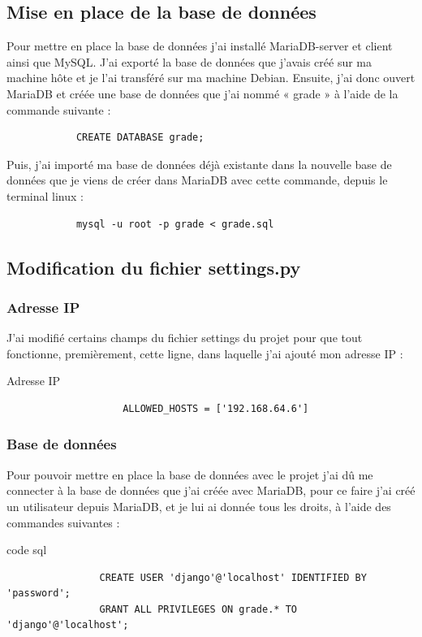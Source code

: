 \documentclass[12pt, a4paper]{article}
\begin{document}
        \subsection{Mise en place de la base de données}
        Pour mettre en place la base de données j’ai installé MariaDB-server et client ainsi que MySQL. J’ai exporté la base de données que j’avais créé sur ma machine hôte et je l’ai transféré sur ma machine Debian. Ensuite, j’ai donc ouvert MariaDB et créée une base de données que j’ai nommé « grade » à l’aide de la commande suivante : 
        \begin{verbatim}
            CREATE DATABASE grade;
        \end{verbatim}
        Puis, j’ai importé ma base de données déjà existante dans la nouvelle base de données que je viens de créer dans MariaDB avec cette commande, depuis le terminal linux : 
        \begin{verbatim}
            mysql -u root -p grade < grade.sql 
        \end{verbatim}
        \newpage
        \subsection{Modification du fichier settings.py}
            \subsubsection{Adresse IP}
            J’ai modifié certains champs du fichier settings du projet pour que tout fonctionne, premièrement, cette ligne, dans laquelle j’ai ajouté mon adresse IP : 
            \begin{listing}[H]
                \caption{Adresse IP}
                \label{lst:ip}
                \begin{verbatim}
                    ALLOWED_HOSTS = ['192.168.64.6']
                \end{verbatim}
            \end{listing}
            \subsubsection{Base de données}
            Pour pouvoir mettre en place la base de données avec le projet j’ai dû me connecter à la base de données que j’ai créée avec MariaDB, pour ce faire j’ai créé un utilisateur depuis MariaDB, et je lui ai donnée tous les droits, à l’aide des commandes suivantes :
            \begin{listing}[H]
                \caption{code sql}
                \label{lst:sql}
                \begin{verbatim}
                CREATE USER 'django'@'localhost' IDENTIFIED BY 'password';
                GRANT ALL PRIVILEGES ON grade.* TO  'django'@'localhost';
                \end{verbatim}
            \end{listing}
            \newpage
\end{document}

